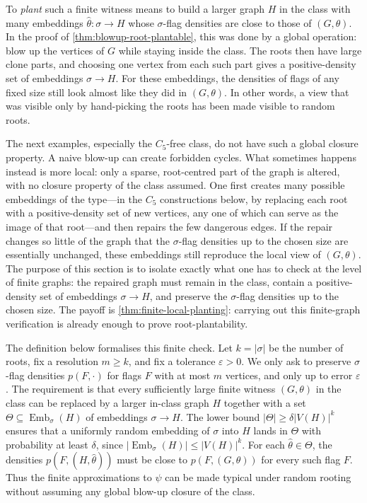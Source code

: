 \documentclass[11pt]{article}
\theoremstyle{definition}
\newcommand{\Emb}{\operatorname{Emb}}
\newcommand{\eps}{\varepsilon}
\begin{document}
To \emph{plant} such a finite witness means to build a larger graph $H$ in the class with
many embeddings $\widehat\theta:\sigma\to H$ whose $\sigma$-flag densities are close to
those of $(G,\theta)$.  In the proof of \cref{thm:blowup-root-plantable}, this was done
by a global operation: blow up the vertices of $G$ while staying inside the class.  The
roots then have large clone parts, and choosing one vertex from each such
part gives a positive-density set of embeddings $\sigma\to H$.  For these embeddings, the
densities of flags of any fixed size still look almost like they did in $(G,\theta)$.
In other words, a view that was visible only by hand-picking the roots has been made
visible to random roots.

The next examples, especially the $C_5$-free class, do not have such a global closure
property.  A naive blow-up can create forbidden cycles.  What sometimes happens instead
is more local: only a sparse, root-centred part of the graph is altered, with no closure
property of the class assumed.  One first creates many possible embeddings of the
type---in the $C_5$ constructions below, by replacing each root with a positive-density set
of new vertices, any one of which can serve as the image of that root---and then repairs the
few dangerous edges.  If the repair changes so little of the graph that the $\sigma$-flag densities up to the
chosen size are essentially unchanged, these embeddings still reproduce the local view of
$(G,\theta)$.  The purpose of this section is to isolate
exactly what one has to check at the level of finite graphs: the repaired graph must
remain in the class, contain a positive-density set of embeddings $\sigma\to H$, and
preserve the $\sigma$-flag densities up to the chosen size.  The payoff is
\cref{thm:finite-local-planting}: carrying out this finite-graph verification is already
enough to prove root-plantability.

The definition below formalises this finite check.  Let $k=|\sigma|$ be the number of
roots, fix a resolution $m\ge k$, and fix a tolerance $\eps>0$.  We only ask
to preserve $\sigma$-flag densities $p(F,\cdot)$ for flags $F$ with at most $m$ vertices,
and only up to error $\eps$.  The requirement is that every sufficiently large finite
witness $(G,\theta)$ in the class can be replaced by a larger in-class graph $H$ together
with a set $\Theta\subseteq\Emb_\sigma(H)$ of embeddings $\sigma\to H$.  The
lower bound $|\Theta|\ge\delta |V(H)|^k$ ensures that a uniformly random embedding
of $\sigma$ into $H$ lands in $\Theta$ with probability at least $\delta$, since
$|\Emb_\sigma(H)|\le |V(H)|^k$.  For each $\widehat\theta\in\Theta$, the densities
$p(F,(H,\widehat\theta))$ must be close to $p(F,(G,\theta))$ for every such flag $F$.
Thus the finite approximations to $\psi$ can be made typical under random rooting
without assuming any global blow-up closure of the class.
\end{document}
